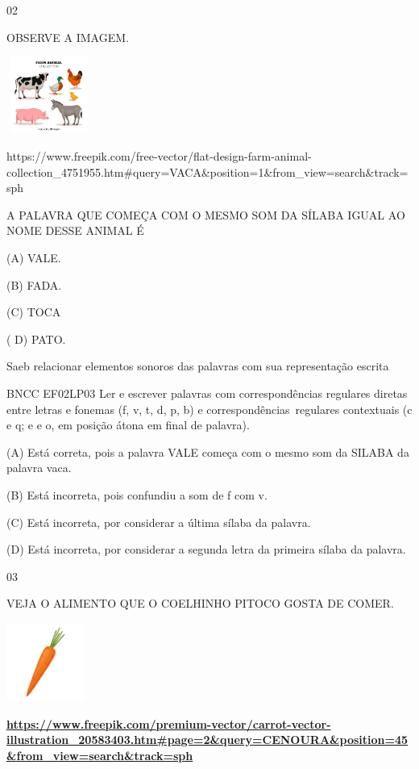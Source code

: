 {{{{{{\num{02}

OBSERVE A IMAGEM.

\includegraphics[width=1.10000in,height=0.99236in]{media/image148.jpeg}

https://www.freepik.com/free-vector/flat-design-farm-animal-collection\_4751955.htm\#query=VACA\&position=1\&from\_view=search\&track=sph

\protect\hypertarget{_Hlk129501578}{}{}A PALAVRA QUE COMEÇA COM O MESMO
SOM DA SÍLABA IGUAL AO NOME DESSE ANIMAL É

(A) VALE.

(B) FADA.

(C) TOCA

( D) PATO.

Saeb relacionar elementos sonoros das palavras com sua representação
escrita

BNCC EF02LP03 Ler e escrever palavras com correspondências regulares
diretas entre letras e fonemas (f, v, t, d, p, b) e
correspondências~regulares contextuais (c e q; e e o, em posição átona
em final de palavra).

\protect\hypertarget{_Hlk129501896}{}{}(A)
\protect\hypertarget{_Hlk129289891}{}{}Está correta, pois a palavra VALE
começa com o mesmo som da SILABA da palavra vaca.

(B) Está incorreta, pois confundiu a som de f com v.

(C) Está incorreta, por considerar a última sílaba da palavra.

(D) Está incorreta, por considerar a segunda letra da primeira sílaba da
palavra.

\num{03}

VEJA O ALIMENTO QUE O COELHINHO PITOCO GOSTA DE COMER.

\includegraphics[width=1.01111in,height=1.01111in]{media/image149.jpeg}

\href{https://www.freepik.com/premium-vector/carrot-vector-illustration_20583403.htm\#page=2\&query=CENOURA\&position=45\&from_view=search\&track=sph}{\textbf{https://www.freepik.com/premium-vector/carrot-vector-illustration\_20583403.htm\#page=2\&query=CENOURA\&position=45\&from\_view=search\&track=sph}}

}}}}}}
